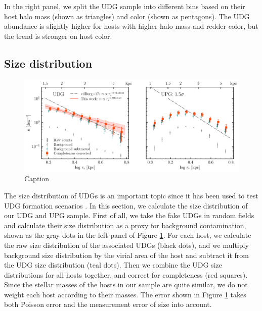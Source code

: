 \documentclass[twocolumn,astrosymb,twocolappendix]{aastex631}
\begin{document}
\begin{CJK*}{UTF8}{gbsn}
In the right panel, we split the UDG sample into different bins based on their host halo mass (shown as triangles) and color (shown as pentagons). The UDG abundance is slightly higher for hosts with higher halo mass and redder color, but the trend is stronger on host color. 


\subsection{Size distribution}\label{sec:size_distr}
\begin{figure}
	\vbox{ 
		\centering
		\includegraphics[width=1\linewidth]{size_distribution.pdf}
	}
    \caption{Caption}
    \label{fig:size_distribution}
\end{figure}

The size distribution of UDGs is an important topic since it has been used to test UDG formation scenarios \citep[e.g.,][]{Amorisco2016,vdBurg2017}. In this section, we calculate the size distribution of our UDG and UPG sample. First of all, we take the fake UDGs in random fields and calculate their size distribution as a proxy for background contamination, shown as the gray dots in the left panel of Figure \ref{fig:size_distribution}. For each host, we calculate the raw size distribution of the associated UDGs (black dots), and we multiply background size distribution by the virial area of the host and subtract it from the UDG size distribution (teal dots). Then we combine the UDG size distributions for all hosts together, and correct for completeness (red squares). Since the stellar masses of the hosts in our sample are quite similar, we do not weight each host according to their masses. The error shown in Figure \ref{fig:size_distribution} takes both Poisson error and the measurement error of size into account.


\end{CJK*}
\end{document}
